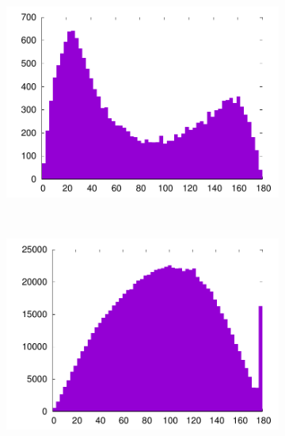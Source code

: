	\newcommand{\subImgWaStats}{0.23\textwidth}
	\begin{figure}[htb]
		\begin{subfigure}[t]{\subImgWaStats}
			\centering
			\includegraphics[width=\textwidth]{figures/ch3/02_DA_all_angles}
			\caption{}
			\label{fig:02_DA_all_angles}
		\end{subfigure}
		~
		\begin{subfigure}[t]{\subImgWaStats}
			\centering
			\includegraphics[width=\textwidth]{figures/ch3/148L_all_angles}
			\caption{}
			\label{fig:148L_all_angles}
		\end{subfigure}
		~
		\begin{subfigure}[t]{\subImgWaStats}
			\centering

\end{subfigure}
\end{figure}
